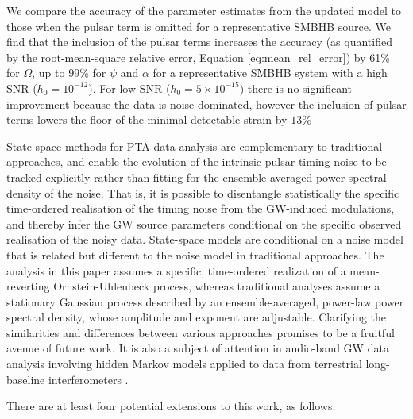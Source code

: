 \documentclass[fleqn,usenatbib,useAMS]{mnras}
\begin{document}
We compare the accuracy of the parameter estimates from the updated model to those when the pulsar term is omitted for a representative SMBHB source. We find that the inclusion of the pulsar terms increases the accuracy (as quantified by the root-mean-square relative error, Equation \eqref{eq:mean_rel_error}) by 61\% for $\Omega$, up to 99\% for $\psi$ and $\alpha$ for a representative SMBHB system with a high SNR ($h_0 = 10^{-12}$). For low SNR ($h_0 = 5 \times 10^{-15}$) there is no significant improvement because the data is noise dominated, however the inclusion of pulsar terms lowers the floor of the minimal detectable strain by $13\%$ \newline  


State-space methods for PTA data analysis are complementary to traditional approaches, and enable the evolution of the intrinsic pulsar timing noise to be tracked explicitly rather than fitting for the ensemble-averaged power spectral density of the noise. That is, it is possible to disentangle statistically the specific time-ordered realisation of the timing noise from the GW-induced modulations, and thereby infer the GW source parameters conditional on the specific observed realisation of the noisy data. State-space models are conditional on a noise model that is related but different to the noise model in traditional approaches. The analysis in this paper assumes a specific, time-ordered realization of a mean-reverting Ornstein-Uhlenbeck process, whereas traditional analyses assume a stationary Gaussian process described by an ensemble-averaged, power-law power spectral density, whose amplitude and exponent are adjustable. Clarifying the similarities and differences between various approaches promises to be a fruitful avenue of future work. It is also a subject of attention in audio-band GW data analysis involving hidden Markov models applied to data from terrestrial long-baseline interferometers \citep{PhysRevD.102.023006,PhysRevD.105.022002,Abbott_2022SCO,2022PhRvD.106f2002A}. \newline 

There are at least four potential extensions to this work, as follows:
\end{document}
